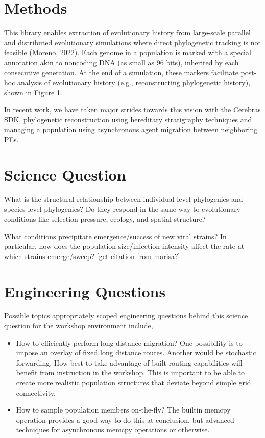 \section{Methods}
This library enables extraction of evolutionary history from large-scale parallel and distributed evolutionary simulations where direct phylogenetic tracking is not feasible (Moreno, 2022). Each genome in a population is marked with a special annotation akin to noncoding DNA (as small as 96 bits), inherited by each consecutive generation. At the end of a simulation, these markers facilitate post-hoc analysis of evolutionary history (e.g., reconstructing phylogenetic history), shown in Figure 1.



In recent work, we have taken major strides towards this vision with the Cerebras SDK, phylogenetic reconstruction using hereditary stratigraphy techniques and managing a population using asynchronous agent migration between neighboring PEs.

\section{Science Question}
What is the structural relationship between individual-level phylogenies and species-level phylogenies? Do they respond in the same way to evolutionary conditions like selection pressure, ecology, and spatial structure?

What conditions precipitate emergence/success of new viral strains? In particular, how does the population size/infection intensity affect the rate at which strains emerge/sweep?  [get citation from marisa?]

\section{Engineering Questions}
Possible topics appropriately scoped engineering questions behind this science question for the workshop environment include,
\begin{itemize}
\item How to efficiently perform long-distance migration?
One possibility is to impose an overlay of fixed long distance routes.
Another would be stochastic forwarding.
How best to take advantage of built-routing capabilities will benefit from instruction in the workshop.
This is important to be able to create more realistic population structures that deviate beyond simple grid connectivity.
\item How to sample population members on-the-fly?
The builtin memcpy operation provides a good way to do this at conclusion, but advanced techniques for asynchronous memcpy operations or otherwise.
\end{itemize}

